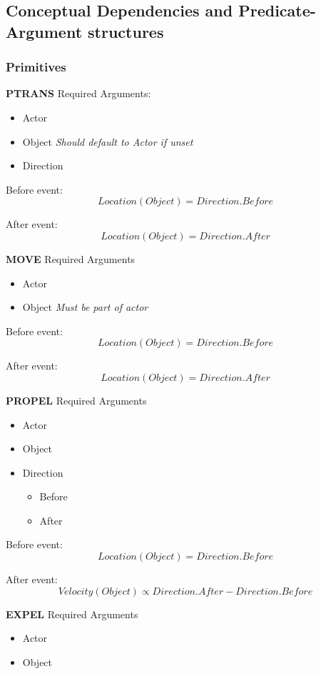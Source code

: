 \documentclass[\mainfile]{subfiles}
\begin{document}
\subsection{Conceptual Dependencies and Predicate-Argument structures}
\subsubsection{Primitives}

\textbf{PTRANS}
Required Arguments:

\begin{itemize}
\item Actor
\item Object \textit{Should default to Actor if unset}
\item Direction
\end{itemize}

Before event:
\[Location(Object) = \textit{Direction.Before}\]

After event:
\[Location(Object) = \textit{Direction.After}\]


\textbf{MOVE}
Required Arguments
\begin{itemize}
\item Actor
\item Object \textit{Must be part of actor}
\end{itemize}

Before event:
\[Location(Object) = \textit{Direction.Before}\]

After event:
\[Location(Object) = \textit{Direction.After}\]

\textbf{PROPEL}
Required Arguments
\begin{itemize}
	\item Actor
    \item Object
    \item Direction
    \begin{itemize}
    	\item Before
        \item After
    \end{itemize}
\end{itemize}

Before event:
\[Location(Object) = \textit{Direction.Before}\]

After event:
\[Velocity(Object) \propto \textit{Direction.After} - \textit{Direction.Before}\]

\textbf{EXPEL}
Required Arguments
\begin{itemize}
	\item Actor
    \item Object
\end{itemize}
\end{document}
